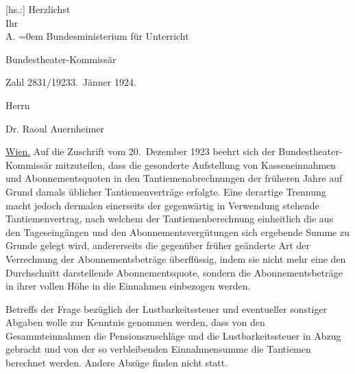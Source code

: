 \pstart
           {[}hs.:{]} Herzlichst{\\[\baselineskip]}Ihr{\\[\baselineskip]}\spacefill\mbox{A.}\pend
           \leftskip=0em{}\vspace{1em}{\vspace{1\baselineskip}}
\pstart
           \raggedleft{}{\pb}Bundesministerium für Unterricht\pend
           
\pstart
           \raggedleft{}Bundestheater-Kommissär\pend
           
\pstart
           Zahl 2831/1923\hfill 3. Jänner 1924.\pend
           
\pstart
           Herrn\pend
           
\pstart
           Dr. Raoul Auernheimer\pend
           
\pstart
           \uline{Wien.}\pend
           \vspace{0.5em}
\pstart
           Auf die Zuschrift vom 20. Dezember 1923 beehrt sich der Bundestheater-Kommissär
               mitzuteilen, dass die gesonderte Aufstellung von Kasseneinnahmen und
               Abonnementsquoten in den Tantiemenabrechnungen der früheren Jahre auf Grund damals
               üblicher Tantiemenverträge erfolgte. Eine derartige Trennung macht jedoch dermalen
               einerseits der gegenwärtig in Verwendung stehende Tantiemenvertrag, nach welchem der
               Tantiemenberechnung einheitlich die aus den Tageseingängen und den
               Abonnementsvergütungen sich ergebende Summe zu Grunde gelegt wird, andererseits die
               gegenüber früher geänderte Art der Verrechnung der Abonnementsbeträge überflüssig,
                  {\pb}indem sie nicht mehr eine den Durchschnitt
               darstellende  Abonnementsquote, sondern die
               Abonnementsbeträge in ihrer vollen Höhe in die Einnahmen einbezogen werden.\pend
           
\pstart
           Betreffs der Frage bezüglich der Lustbarkeitssteuer und eventueller sonstiger Abgaben
               wolle zur Kenntnis genommen werden, dass von den Gesammteinnahmen die
               Pensionszuschläge und die Lustbarkeitssteuer in Abzug gebracht und von der so
               verbleibenden Einnahmensumme die Tantiemen berechnet werden. Andere Abzüge finden
               nicht statt.\pend
           
